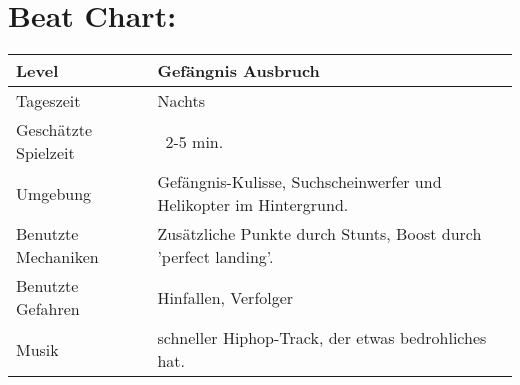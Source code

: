 \documentclass[paper=a4,fontsize=12pt,ngerman]{scrartcl}
\begin{document}
\section{Beat Chart:}
\begin{tabular}[h]{|l|l|}
	\hline
	Level & Gefängnis Ausbruch \\
	\hline
	Tageszeit & Nachts \\
	\hline
	Geschätzte Spielzeit & ~2-5 min.\\
	Umgebung & Gefängnis-Kulisse, Suchscheinwerfer und Helikopter im
	Hintergrund.
\\
	\hline
	Benutzte Mechaniken & Zusätzliche Punkte durch Stunts, Boost durch 'perfect landing'.\\
	\hline
	Benutzte Gefahren & Hinfallen, Verfolger \\
	\hline
	Musik & schneller Hiphop-Track, der etwas bedrohliches hat. \\
	\hline
\end{tabular}
\clearpage
\end{document}
